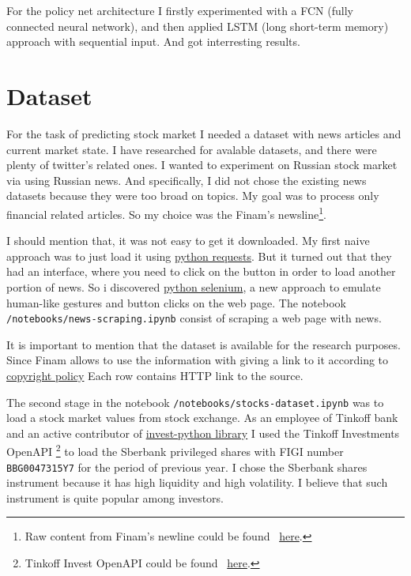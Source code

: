 \documentclass{article}
\begin{document}
For the policy net architecture I firstly experimented with a FCN (fully connected neural network), and then applied LSTM (long short-term memory) approach with sequential input. And got interresting results.

\section{Dataset}
\label{sec:dataset}
For the task of predicting stock market I needed a dataset with news articles and current market state.
I have researched for avalable datasets, and there were plenty of twitter's related ones.
I wanted to experiment on Russian stock market via using Russian news. 
And specifically, I did not chose the existing news datasets because they were too broad on topics. My goal was to process only financial related articles.
So my choice was the Finam's newsline\footnote{Raw content from Finam's newline could be found ~\href{https://www.finam.ru/publications/selection/united/}{here}.}.

I should mention that, it was not easy to get it downloaded. 
My first naive approach was to just load it using \href{https://pypi.org/project/requests/}{python requests}. But it turned out that they had an interface, where you need to click on the button in order to load another portion of news. So i discovered \href{https://pypi.org/project/selenium/}{python selenium}, a new approach to emulate human-like gestures and button clicks on the web page.
The notebook \texttt{/notebooks/news-scraping.ipynb} consist of scraping a web page with news.

It is important to mention that the dataset is available for the research purposes. 
Since Finam allows to use the information with giving a link to it according to \href{https://www.finam.ru/about/copyright/}{copyright policy}
Each row contains HTTP link to the source.

The second stage in the notebook \texttt{/notebooks/stocks-dataset.ipynb} was to load a stock market values from stock exchange. 
As an employee of Tinkoff bank and an active contributor of \href{https://github.com/Tinkoff/invest-python}{invest-python library} I used the Tinkoff Investments OpenAPI \footnote{Tinkoff Invest OpenAPI could be found ~\href{https://www.tinkoff.ru/invest/open-api/}{here}.} to load the Sberbank privileged shares with FIGI number \texttt{BBG0047315Y7} for the period of previous year. I chose the Sberbank shares instrument because it has high liquidity and high volatility. I believe that such instrument is quite popular among investors.
\end{document}
